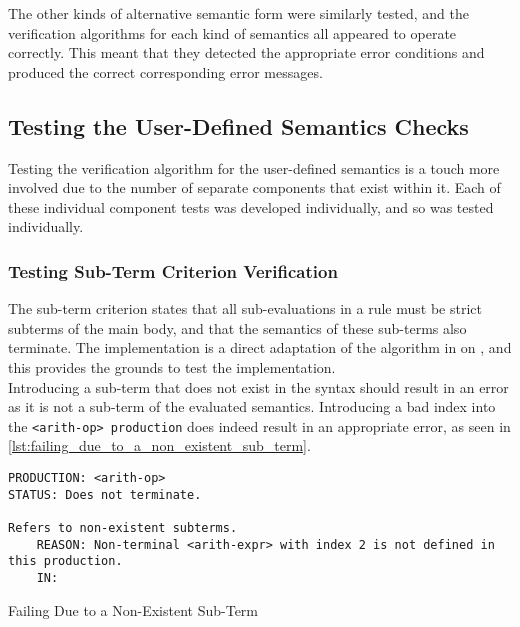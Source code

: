 The other kinds of alternative semantic form were similarly tested, and the verification algorithms for each kind of semantics all appeared to operate correctly.
This meant that they detected the appropriate error conditions and produced the correct corresponding error messages.


\subsection{Testing the User-Defined Semantics Checks} %
\label{sub:testing_the_user_defined_semantics_checks}
Testing the verification algorithm for the user-defined semantics is a touch more involved due to the number of separate components that exist within it. 
Each of these individual component tests was developed individually, and so was tested individually. 

\subsubsection{Testing Sub-Term Criterion Verification} %
\label{ssub:testing_sub_term_criterion_verification}
The sub-term criterion states that all sub-evaluations in a rule must be strict subterms of the main body, and that the semantics of these sub-terms also terminate. 
The implementation is a direct adaptation of the algorithm in  on , and this provides the grounds to test the implementation.\\

Introducing a sub-term that does not exist in the syntax should result in an error as it is not a sub-term of the evaluated semantics.
Introducing a bad index into the \texttt{<arith-op> production} does indeed result in an appropriate error, as seen in \autoref{lst:failing_due_to_a_non_existent_sub_term}.

\begin{listing}[!htb]
\begin{verbatim}
PRODUCTION: <arith-op>
STATUS: Does not terminate.

Refers to non-existent subterms.
    REASON: Non-terminal <arith-expr> with index 2 is not defined in this production.
    IN:
\end{verbatim}
\caption{Failing Due to a Non-Existent Sub-Term}
\label{lst:failing_due_to_a_non_existent_sub_term}
\end{listing}

